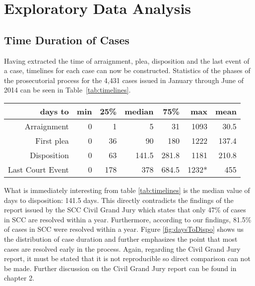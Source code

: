 \section{Exploratory Data Analysis}
\subsection{Time Duration of Cases}
Having extracted the time of arraignment, plea, disposition and the last event of a case, timelines for each case can now be constructed. Statistics of the phases of the prosecutorial process for the 4,431 cases issued in January through June of 2014 can be seen in Table~\ref{tab:timelines}.

\begin{table*}
\centering
  \begin{tabular}{r|r|r|r|r|r|r}
days to	            &min	&25\%   &median		&75\%   &max    &mean\\
\hline
Arraignment	        &0	    &1	    &5          &31	    &1093   &30.5\\
First plea	        &0	    &36	    &90         &180	&1222   &137.4\\
Disposition	        &0	    &63	    &141.5      &281.8	&1181   &210.8\\
Last Court Event	&0	    &178    &378	    &684.5	&1232*  &455\\
\hline
\end{tabular}
\caption{Statistics on the duration of the prosecutorial process in four phases from the day the case was issued for the 4,431 cases issued between January and June of 2014 by SCC with {\it complete} information (i.e. missing data were removed by row).
(*) The last event is the latest event logged, but we have no information to indicate whether future court events are possible or expected.
}
\label{tab:timelines}
\end{table*}

What is immediately interesting from table \ref{tab:timelines} is the median value of days to disposition: 141.5 days. This directly contradicts the findings of the report issued by the SCC Civil Grand Jury which states that only 47\% of cases in SCC are resolved within a year. Furthermore, according to our findings, 81.5\% of cases in SCC were resolved within a year. Figure \ref{fig:daysToDispo} shows us the distribution of case duration and further emphasizes the point that most cases are resolved early in the process. Again, regarding the Civil Grand Jury report, it must be stated that it is not reproducible so direct comparison can not be made. Further discussion on the Civil Grand Jury report can be found in chapter 2. 

